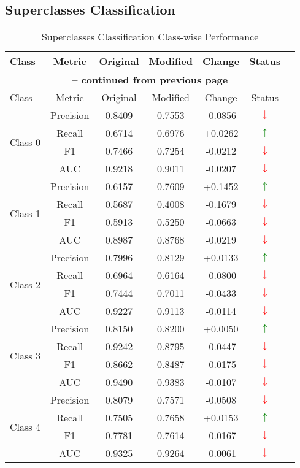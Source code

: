 \documentclass[12pt,a4paper]{article}
\begin{document}
\subsection{Superclasses Classification}
\begin{longtable}{lcccccc}
\caption{Superclasses Classification Class-wise Performance}
\label{tab:superclass_metrics} \\
\toprule
Class & Metric & Original & Modified & Change & Status \\
\midrule
\endfirsthead
\multicolumn{6}{c}{{\bfseries \tablename\ \thetable{} -- continued from previous page}} \\
\toprule
Class & Metric & Original & Modified & Change & Status \\
\midrule
\endhead
\multirow{4}{*}{Class 0} & Precision & 0.8409 & 0.7553 & -0.0856 & \textcolor{red}{$\downarrow$} \\
 & Recall & 0.6714 & 0.6976 & +0.0262 & \textcolor{green}{$\uparrow$} \\
 & F1 & 0.7466 & 0.7254 & -0.0212 & \textcolor{red}{$\downarrow$} \\
 & AUC & 0.9218 & 0.9011 & -0.0207 & \textcolor{red}{$\downarrow$} \\
\midrule
\multirow{4}{*}{Class 1} & Precision & 0.6157 & 0.7609 & +0.1452 & \textcolor{green}{$\uparrow$} \\
 & Recall & 0.5687 & 0.4008 & -0.1679 & \textcolor{red}{$\downarrow$} \\
 & F1 & 0.5913 & 0.5250 & -0.0663 & \textcolor{red}{$\downarrow$} \\
 & AUC & 0.8987 & 0.8768 & -0.0219 & \textcolor{red}{$\downarrow$} \\
\midrule
\multirow{4}{*}{Class 2} & Precision & 0.7996 & 0.8129 & +0.0133 & \textcolor{green}{$\uparrow$} \\
 & Recall & 0.6964 & 0.6164 & -0.0800 & \textcolor{red}{$\downarrow$} \\
 & F1 & 0.7444 & 0.7011 & -0.0433 & \textcolor{red}{$\downarrow$} \\
 & AUC & 0.9227 & 0.9113 & -0.0114 & \textcolor{red}{$\downarrow$} \\
\midrule
\multirow{4}{*}{Class 3} & Precision & 0.8150 & 0.8200 & +0.0050 & \textcolor{green}{$\uparrow$} \\
 & Recall & 0.9242 & 0.8795 & -0.0447 & \textcolor{red}{$\downarrow$} \\
 & F1 & 0.8662 & 0.8487 & -0.0175 & \textcolor{red}{$\downarrow$} \\
 & AUC & 0.9490 & 0.9383 & -0.0107 & \textcolor{red}{$\downarrow$} \\
\midrule
\multirow{4}{*}{Class 4} & Precision & 0.8079 & 0.7571 & -0.0508 & \textcolor{red}{$\downarrow$} \\
 & Recall & 0.7505 & 0.7658 & +0.0153 & \textcolor{green}{$\uparrow$} \\
 & F1 & 0.7781 & 0.7614 & -0.0167 & \textcolor{red}{$\downarrow$} \\
 & AUC & 0.9325 & 0.9264 & -0.0061 & \textcolor{red}{$\downarrow$} \\
\bottomrule
\end{longtable}
\end{document}
